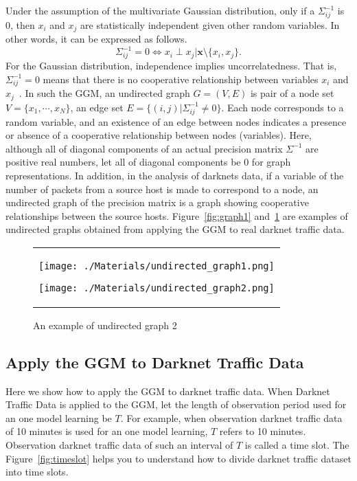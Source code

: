 \documentclass{sig-alternate-10pt}
\begin{document}
Under the assumption of the multivariate Gaussian distribution, only if a $\Sigma^{-1}_{ij}$ is ​​0, then $x_ {i}$ and $x_ {j}$ are statistically independent given other random variables.
In other words, it can be expressed as follows.
\begin{equation*} 
\Sigma^{-1}_{ij}=0\Leftrightarrow x_i \perp x_j | \bm{x} \setminus \{ x_i, x_j \}.
\end{equation*}
For the Gaussian distribution, independence implies uncorrelatedness.
That is, $\Sigma^{-1}_{ij}=0$ means that there is no cooperative relationship between variables $x_{i}$ and $x_{j}$~\cite{Ide}.
In such the GGM, an undirected graph $G = (V, E)$ is pair of a node set $V=\{x_{1}, \cdots, x_{N}\}$, an edge set $E=\{(i,j)|\Sigma^{-1}_{ij}\neq0\}$.
Each node corresponds to a random variable, and an existence of an edge between nodes indicates a presence or absence of a cooperative relationship between nodes (variables).
Here, although all of diagonal components of an actual precision matrix $\Sigma^{-1}$ are positive real numbers, let all of diagonal components be 0 for graph representations.
In addition, in the analysis of darknets data, if a variable of the number of packets from a source host is made to correspond to a node, an undirected graph of the precision matrix is a graph showing cooperative relationships between the source hosts.
Figure~\ref{fig:graph1} and~\ref{fig:graph2} are examples of undirected graphs obtained from applying the GGM to real darknet traffic data.

\begin{figure}[htbp]
\begin{tabular}{c}
	\begin{minipage}{0.5\hsize}
		\texttt{[image: ./Materials/undirected\_graph1.png]}
		\caption{An example of \newline undirected graph 1}
		\label{fig:graph1}
 	\end{minipage}
 	\begin{minipage}{0.5\hsize}
		\texttt{[image: ./Materials/undirected\_graph2.png]}
		\caption{An example of \newline undirected graph 2}
  		\label{fig:graph2}
 	\end{minipage}
\end{tabular}
\end{figure}


\subsection{Apply the GGM to Darknet Traffic Data}
Here we show how to apply the GGM to darknet traffic data.
When Darknet Traffic Data is applied to the GGM, let the length of observation period used for an one model learning be $T$.
For example, when observation darknet traffic data of 10 minutes is used for an one model learning, $T$ refers to 10 minutes.
Observation darknet traffic data of such an interval of $T$ is called a time slot.
The Figure~\ref{fig:timeslot} helps you to understand how to divide darknet traffic dataset into time slots.
\end{document}
